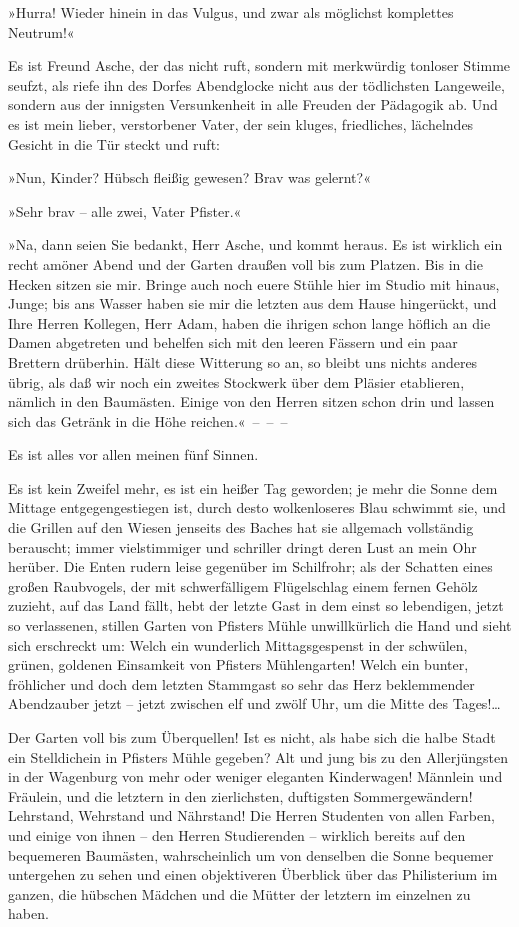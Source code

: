 »Hurra! Wieder hinein in das Vulgus, und zwar als möglichst
komplettes Neutrum!«

Es ist Freund Asche, der das nicht ruft, sondern mit merkwürdig
tonloser Stimme seufzt, als riefe ihn des Dorfes Abendglocke nicht
aus der tödlichsten Langeweile, sondern aus der innigsten
Versunkenheit in alle Freuden der Pädagogik ab. Und es ist mein
lieber, verstorbener Vater, der sein kluges, friedliches,
lächelndes Gesicht in die Tür steckt und ruft:

»Nun, Kinder? Hübsch fleißig gewesen? Brav was gelernt?«

»Sehr brav – alle zwei, Vater Pfister.«

»Na, dann seien Sie bedankt, Herr Asche, und kommt heraus. Es ist
wirklich ein recht amöner Abend und der Garten draußen voll bis zum
Platzen. Bis in die Hecken sitzen sie mir. Bringe auch noch euere
Stühle hier im Studio mit hinaus, Junge; bis ans Wasser haben sie
mir die letzten aus dem Hause hingerückt, und Ihre Herren Kollegen,
Herr Adam, haben die ihrigen schon lange höflich an die Damen
abgetreten und behelfen sich mit den leeren Fässern und ein paar
Brettern drüberhin. Hält diese Witterung so an, so bleibt uns
nichts anderes übrig, als daß wir noch ein zweites Stockwerk über
dem Pläsier etablieren, nämlich in den Baumästen. Einige von den
Herren sitzen schon drin und lassen sich das Getränk in die Höhe
reichen.«~–~–~–

Es ist alles vor allen meinen fünf Sinnen.

Es ist kein Zweifel mehr, es ist ein heißer Tag geworden; je mehr
die Sonne dem Mittage entgegengestiegen ist, durch desto
wolkenloseres Blau schwimmt sie, und die Grillen auf den Wiesen
jenseits des Baches hat sie allgemach vollständig berauscht; immer
vielstimmiger und schriller dringt deren Lust an mein Ohr herüber.
Die Enten rudern leise gegenüber im Schilfrohr; als der Schatten
eines großen Raubvogels, der mit schwerfälligem Flügelschlag einem
fernen Gehölz zuzieht, auf das Land fällt, hebt der letzte Gast in
dem einst so lebendigen, jetzt so verlassenen, stillen Garten von
Pfisters Mühle unwillkürlich die Hand und sieht sich erschreckt um:
Welch ein wunderlich Mittagsgespenst in der schwülen, grünen,
goldenen Einsamkeit von Pfisters Mühlengarten! Welch ein bunter,
fröhlicher und doch dem letzten Stammgast so sehr das Herz
beklemmender Abendzauber jetzt – jetzt zwischen elf und zwölf Uhr,
um die Mitte des Tages!\ldots{}

Der Garten voll bis zum Überquellen! Ist es nicht, als habe sich
die halbe Stadt ein Stelldichein in Pfisters Mühle gegeben? Alt und
jung bis zu den Allerjüngsten in der Wagenburg von mehr oder
weniger eleganten Kinderwagen! Männlein und Fräulein, und die
letztern in den zierlichsten, duftigsten Sommergewändern!
Lehrstand, Wehrstand und Nährstand! Die Herren Studenten von allen
Farben, und einige von ihnen – den Herren Studierenden – wirklich
bereits auf den bequemeren Baumästen, wahrscheinlich um von
denselben die Sonne bequemer untergehen zu sehen und einen
objektiveren Überblick über das Philisterium im ganzen, die
hübschen Mädchen und die Mütter der letztern im einzelnen zu
haben.

